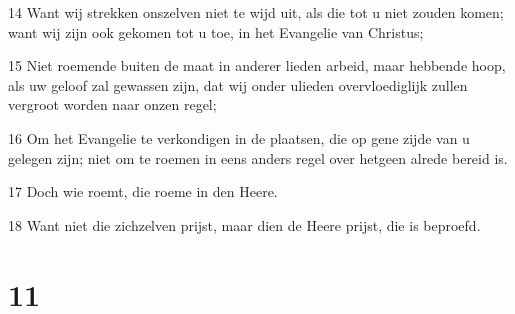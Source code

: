 \par 14 Want wij strekken onszelven niet te wijd uit, als die tot u niet zouden komen; want wij zijn ook gekomen tot u toe, in het Evangelie van Christus;
\par 15 Niet roemende buiten de maat in anderer lieden arbeid, maar hebbende hoop, als uw geloof zal gewassen zijn, dat wij onder ulieden overvloediglijk zullen vergroot worden naar onzen regel;
\par 16 Om het Evangelie te verkondigen in de plaatsen, die op gene zijde van u gelegen zijn; niet om te roemen in eens anders regel over hetgeen alrede bereid is.
\par 17 Doch wie roemt, die roeme in den Heere.
\par 18 Want niet die zichzelven prijst, maar dien de Heere prijst, die is beproefd.

\chapter{11}

